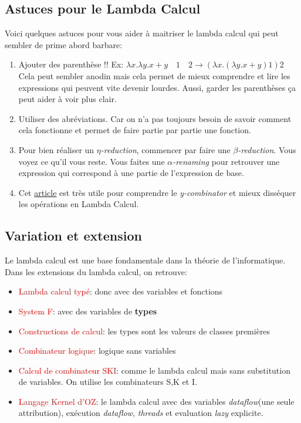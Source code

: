 \documentclass{report}
\begin{document}
\subsection{Astuces pour le Lambda Calcul}
Voici quelques astuces pour vous aider à maitriser le lambda calcul qui peut sembler de prime abord barbare:
\begin{enumerate}
\item Ajouter des parenthèse !! Ex: $\lambda x.\lambda y.x + y \quad 1 \quad 2 \rightarrow (\lambda x.(\lambda y.x+y)1)2$ Cela peut sembler anodin mais cela permet de mieux comprendre et lire les expressions qui peuvent vite devenir lourdes. Aussi, garder les parenthèses ça peut aider à voir plus clair. 
\item Utiliser des abréviations. Car on n'a pas toujours besoin de savoir comment cela fonctionne et permet de faire partie par partie une fonction.
\item Pour bien réaliser un $\eta$\textit{-reduction}, commencer par faire une $\beta$\textit{-reduction}. Vous voyez ce qu'il vous reste. Vous faites une $\alpha$\textit{-renaming} pour retrouver une expression qui correspond à une partie de l'expression de base.
\item Cet \href{https://medium.com/@ayanonagon/the-y-combinator-no-not-that-one-7268d8d9c46}{article} est très utile pour comprendre le \textit{y-combinator} et mieux disséquer les opérations en Lambda Calcul.
\end{enumerate}

\subsection{Variation et extension}
Le lambda calcul est une base fondamentale dans la théorie de l'informatique. Dans les extensions du lambda calcul, on retrouve:
\begin{itemize}
\item \textcolor{red}{Lambda calcul typé}: donc avec des variables et fonctions
\item \textcolor{red}{System F}: avec des variables de \textbf{types}
\item \textcolor{red}{Constructions de calcul}: les types sont les valeurs de classes premières
\item \textcolor{red}{Combinateur logique}: logique sans variables
\item \textcolor{red}{Calcul de combinateur SKI}: comme le lambda calcul mais sans substitution de variables. On utilise les combinateurs S,K et I.
\item \textcolor{red}{Langage Kernel d'OZ}: le lambda calcul avec des variables \textit{dataflow}(une seule attribution), exécution \textit{dataflow}, \textit{threads} et evaluation \textit{lazy} explicite.
\end{itemize}
\end{document}

